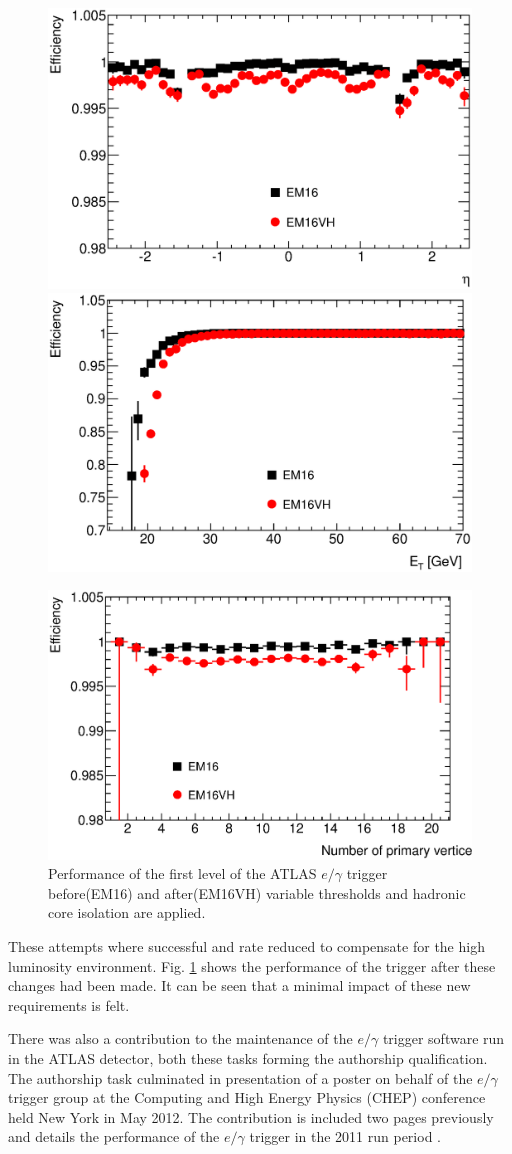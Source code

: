 		\begin{figure}[h!]
			\centering
				\includegraphics[width=0.49\linewidth]{images/L1_EM16VH_TandP_eff_vs_eta.eps}
				\includegraphics[width=0.49\linewidth]{images/L1_EM16VH_TandP_eff_vs_Et.eps}

				\includegraphics[width=0.49\linewidth]{images/L1_EM16VH_TandP_eff_vs_pvx.eps}
			\caption{Performance of the first level of the ATLAS $e/\gamma$ trigger before(EM16) and after(EM16VH) variable thresholds and hadronic core isolation are applied.}
			\label{fig:L1}
		\end{figure}

		These attempts where successful and rate reduced to compensate for the high luminosity environment. Fig. \ref{fig:L1} shows the performance of the trigger after these changes had been made. It can be seen that a minimal impact of these new requirements is felt.


		There was also a contribution to the maintenance of the $e/\gamma$ trigger software run in the ATLAS detector, both these tasks forming the authorship qualification. The authorship task culminated in presentation of a poster on behalf of the $e/\gamma$ trigger group at the Computing and High Energy Physics (CHEP) conference held New York in May 2012. The contribution is included two pages previously and details the performance of the $e/\gamma$ trigger in the 2011 run period \cite{poster}.

